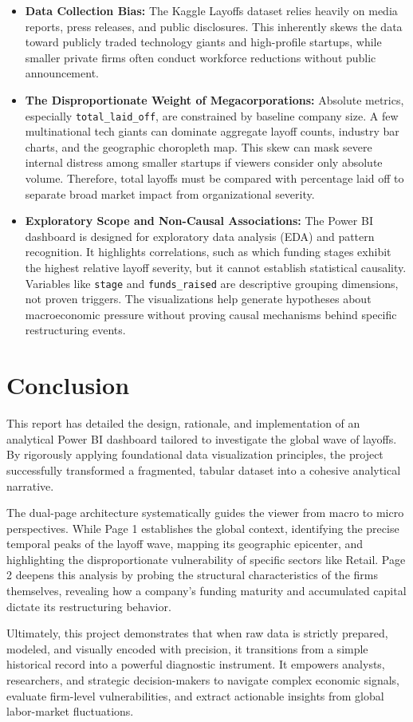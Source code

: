 \documentclass[a4paper,12pt]{article}
\begin{document}
\begin{itemize}
    \item \textbf{Data Collection Bias:} The Kaggle Layoffs dataset relies heavily on media reports, press releases, and public disclosures. This inherently skews the data toward publicly traded technology giants and high-profile startups, while smaller private firms often conduct workforce reductions without public announcement.
    
    \item \textbf{The Disproportionate Weight of Megacorporations:} Absolute metrics, especially \texttt{total\_laid\_off}, are constrained by baseline company size. A few multinational tech giants can dominate aggregate layoff counts, industry bar charts, and the geographic choropleth map. This skew can mask severe internal distress among smaller startups if viewers consider only absolute volume. Therefore, total layoffs must be compared with percentage laid off to separate broad market impact from organizational severity.
    
    \item \textbf{Exploratory Scope and Non-Causal Associations:} The Power BI dashboard is designed for exploratory data analysis (EDA) and pattern recognition. It highlights correlations, such as which funding stages exhibit the highest relative layoff severity, but it cannot establish statistical causality. Variables like \texttt{stage} and \texttt{funds\_raised} are descriptive grouping dimensions, not proven triggers. The visualizations help generate hypotheses about macroeconomic pressure without proving causal mechanisms behind specific restructuring events.
\end{itemize}

\section{Conclusion}
This report has detailed the design, rationale, and implementation of an analytical Power BI dashboard tailored to investigate the global wave of layoffs. By rigorously applying foundational data visualization principles, the project successfully transformed a fragmented, tabular dataset into a cohesive analytical narrative. 

The dual-page architecture systematically guides the viewer from macro to micro perspectives. While Page 1 establishes the global context, identifying the precise temporal peaks of the layoff wave, mapping its geographic epicenter, and highlighting the disproportionate vulnerability of specific sectors like Retail. Page 2 deepens this analysis by probing the structural characteristics of the firms themselves, revealing how a company's funding maturity and accumulated capital dictate its restructuring behavior.

Ultimately, this project demonstrates that when raw data is strictly prepared, modeled, and visually encoded with precision, it transitions from a simple historical record into a powerful diagnostic instrument. It empowers analysts, researchers, and strategic decision-makers to navigate complex economic signals, evaluate firm-level vulnerabilities, and extract actionable insights from global labor-market fluctuations.
\end{document}
